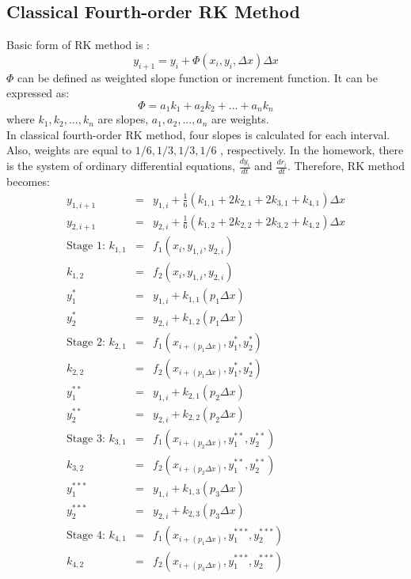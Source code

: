 \documentclass[letterpaper,12pt]{article}
\begin{document}
\subsection{Classical Fourth-order RK Method}
Basic form of RK method is :
\begin{equation}
	y_{i+1} = y_i + \Phi(x_i, y_i, \Delta x) \Delta x
	\label{eqn:rk}  
\end{equation} 
$\Phi$ can be defined as weighted slope function or increment function. It can be expressed as:
\begin{equation}
	\Phi = a_1k_1 + a_2k_2 + ... + a_nk_n
\end{equation}
where $k_1, k_2, ..., k_n$ are slopes, $a_1, a_2, ..., a_n$  are weights.\\
In classical fourth-order RK method, four slopes is calculated for each interval. Also, weights are equal to $1/6, 1/3, 1/3, 1/6$
, respectively. In the homework, there is the system of ordinary differential equations, $\frac{dy_i}{dt}$ and $\frac{dr_i}{dt}$. 
Therefore, RK method becomes:
\begin{eqnarray}
	y_{1,i+1}&=&y_{1,i} + \frac{1}{6}(k_{1,1} + 2k_{2,1} + 2k_{3,1} + k_{4,1})\Delta x \nonumber \\
	y_{2,i+1}&=&y_{2,i} + \frac{1}{6}(k_{1,2} + 2k_{2,2} + 2k_{3,2} + k_{4,2})\Delta x \nonumber \\
	\mbox{Stage 1: }k_{1,1}&=&f_1(x_i, y_{1,i}, y_{2,i} ) \nonumber \\
	k_{1,2}&=&f_2(x_i, y_{1,i}, y_{2,i}) \nonumber \\
	y^{*}_1 &=& y_{1,i} + k_{1,1}(p_1\Delta x) \nonumber \\
	y^{*}_2 &=& y_{2,i} + k_{1,2}(p_1\Delta x) \nonumber \\
	\mbox{Stage 2: }k_{2,1}&=&f_1(x_{i+(p_1\Delta x)} ,y^{*}_1, y^{*}_2 ) \nonumber \\
	k_{2,2}&=&f_2(x_{i+(p_1\Delta x)} ,y^{*}_1, y^{*}_2 ) \nonumber \\
	y^{**}_1&=&y_{1,i} + k_{2,1}(p_2\Delta x) \nonumber \\
	y^{**}_2&=&y_{2,i} + k_{2,2}(p_2\Delta x) \nonumber \\
	\mbox{Stage 3: }k_{3,1}&=&f_1(x_{i+(p_2\Delta x)} ,y^{**}_1, y^{**}_2 ) \nonumber \\
	k_{3,2}&=&f_2(x_{i+(p_2\Delta x)} ,y^{**}_1, y^{**}_2 ) \nonumber \\
	y^{***}_1&=&y_{1,i} + k_{1,3}(p_3\Delta x) \nonumber \\
	y^{***}_2&=&y_{2,i} + k_{2,3}(p_3\Delta x) \nonumber \\
	\mbox{Stage 4: }k_{4,1}&=&f_1(x_{i+(p_1\Delta x)} ,y^{***}_1, y^{***}_2 ) \nonumber \\
	k_{4,2}&=&f_2(x_{i+(p_3\Delta x)} ,y^{***}_1, y^{***}_2 ) \nonumber
\end{eqnarray}
\end{document}
